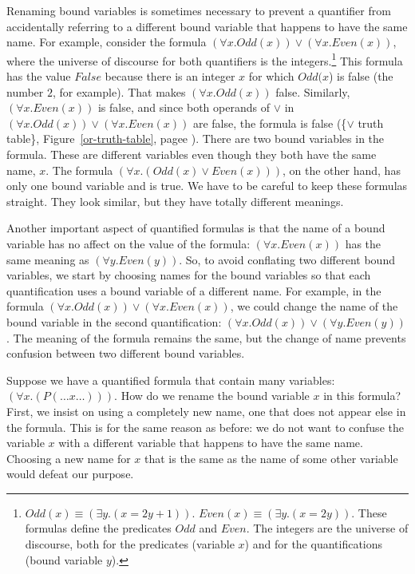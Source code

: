 {{Renaming bound variables is sometimes necessary to prevent
a quantifier from accidentally referring to a different bound variable
that happens to have the same name.
For example, consider the formula
$(\forall x.Odd(x)) \vee (\forall x.Even(x))$,
where the universe of discourse for both quantifiers is the integers.\footnote{$Odd(x) \equiv (\exists y.(x = 2y+1))$.
\label{even-number-predicate-Even}
$Even(x) \equiv (\exists y.(x = 2y))$.
These formulas define the predicates $Odd$ and $Even$.
The integers are the universe of discourse,
both for the predicates (variable $x$)
and for the quantifications (bound variable $y$).}
This formula has the value $False$ because there
is an integer $x$ for which $Odd(x$) is false (the number $2$, for example).
That makes $(\forall x.Odd(x))$ false.
Similarly, $(\forall x.Even(x))$ is false,
and since both operands of $\vee$ in $(\forall x.Odd(x)) \vee (\forall x.Even(x))$
are false, the formula is false (\{$\vee$ truth table\},
Figure~\ref{or-truth-table}, pagee \pageref{or-truth-table}).
There are two bound variables in the formula.
These are different variables even though they both have
the same name, $x$.
The formula $(\forall x.(Odd(x) \vee Even(x)))$, on the other hand,
has only one bound variable and is true.
We have to be careful to keep these formulas straight.
They look similar, but they have totally different meanings.

Another important aspect of quantified formulas is that
the name of a bound variable has no affect on the value
of the formula:
$(\forall x.Even(x))$ has the same meaning
as $(\forall y.Even(y))$.
So, to avoid conflating two different bound variables,
we start by choosing names for the bound variables
so that each quantification uses a bound variable of a different name.
For example, in the formula
$(\forall x.Odd(x)) \vee (\forall x.Even(x))$,
we could change the name of the bound variable
in the second quantification:
$(\forall x.Odd(x)) \vee (\forall y.Even(y))$.
The meaning of the formula remains the same,
but the change of name prevents confusion between two different bound variables.

Suppose we have a quantified formula that contain
many variables: $(\forall x.(P(\dots x \dots)))$.
How do we rename the bound variable $x$ in this formula?
First, we insist on using a completely new name,
one that does not appear else in the formula.
This is for the same reason as before: we do not want to confuse the variable
$x$ with a different variable that happens to have the same name.
Choosing a new name for $x$ that is the same as the name
of some other variable would defeat our purpose.

}}
